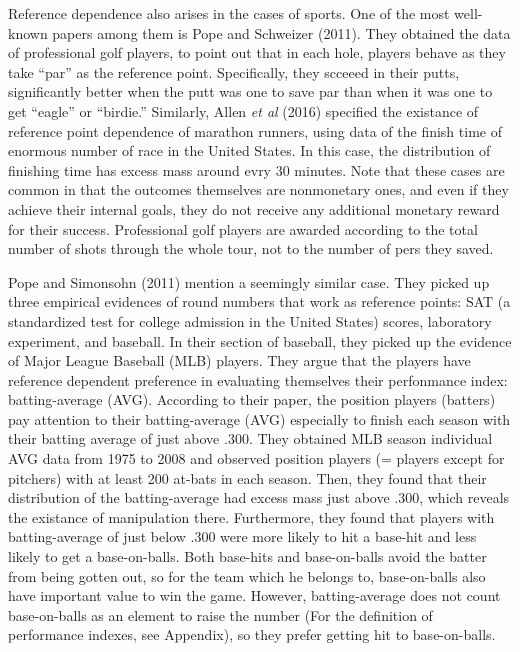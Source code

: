 \documentclass[dvipdfmx, 12pt]{article}
\begin{document}
\vspace{1zw}


Reference dependence also arises in the cases of sports. One of the most well-known papers among them is Pope and Schweizer (2011). They obtained the data of professional golf players, to point out that in each hole, players behave as they take ``par'' as the reference point. Specifically, they scceeed in their putts, significantly better when the putt was one to save par than when it was one to get ``eagle'' or ``birdie.'' Similarly, Allen \textit{et al} (2016) specified the existance of reference point dependence of marathon runners, using data of the finish time of enormous number of race in the United States. In this case, the distribution of finishing time has excess mass around evry 30 minutes. Note that these cases are common in that the outcomes themselves are nonmonetary ones, and even if they achieve their internal goals, they do not receive any additional monetary reward for their success. Professional golf players are awarded according to the total number of shots through the whole tour, not to the number of pers they saved.

Pope and Simonsohn (2011) mention a seemingly similar case. They picked up three empirical evidences of round numbers that work as reference points: SAT (a standardized test for college admission in the United States) scores, laboratory experiment, and baseball. In their section of baseball, they picked up the evidence of Major League Baseball (MLB) players. They argue that the players have reference dependent preference in evaluating themselves their perfonmance index: batting-average (AVG). According to their paper, the position players (batters) pay attention to their batting-average (AVG) especially to finish each season with their batting average of just above .300. They obtained MLB season individual AVG data from 1975 to 2008 and observed position players (= players except for pitchers) with at least 200 at-bats in each season. Then, they found that their distribution of the batting-average had excess mass just above .300, which reveals the existance of manipulation there. Furthermore, they found that players with batting-average of just below .300 were more likely to hit a base-hit and less likely to get a base-on-balls. Both base-hits and base-on-balls avoid the batter from being gotten out, so for the team which he belongs to, base-on-balls also have important value to win the game. However, batting-average does not count base-on-balls as an element to raise the number (For the definition of performance indexes, see Appendix), so they prefer getting hit to base-on-balls. %
\end{document}
